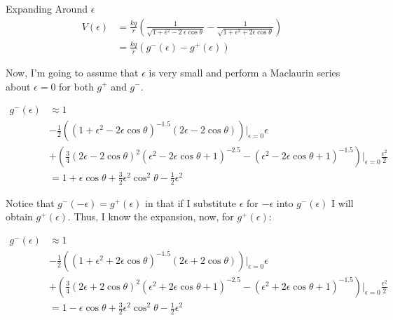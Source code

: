 \begin{homeworkProblem}[Quiz 4]
\begin{homeworkSection}{Expanding Around $\epsilon$}
    \begin{align}
        \label{}
        V(\epsilon) &= \frac{k q}{r} 
        \left(
        \frac{1}{\sqrt{1+\epsilon^2-2\ \epsilon \cos\theta}} -
        \frac{1}{\sqrt{1+ \epsilon^2+2 \epsilon \cos\theta}}
        \right) \nonumber \\
        &= \frac{k q}{r} \left( g^-(\epsilon) - g^+(\epsilon) \right)
        \nonumber
    \end{align}

    Now, I'm going to assume that $\epsilon$ is very small and perform a
    Maclaurin series about $\epsilon = 0$ for both $g^+$ and $g^-$.

    \begin{align}
       \label{}
       g^-(\epsilon) &\approx 1 \nonumber \\
       &-\frac{1}{2}\left(
       \left(1+\epsilon^2-2\epsilon\cos\theta\right)^{-1.5}(2\epsilon
       -2\cos\theta)\right)\bigg|_{\epsilon=0}\epsilon \nonumber \\
       &+\left(
       \frac{3}{4}\left(2\epsilon-2\cos\theta\right)^2(\epsilon^2-2\epsilon\cos\theta+1)^{-2.5}
       -\left(\epsilon^2-2\epsilon\cos\theta+1\right)^{-1.5}
       \right)\bigg|_{\epsilon=0}\frac{\epsilon^2}{2} \nonumber
       \\
       &= 1 + \epsilon \cos\theta + \frac{3}{2}\epsilon^2\cos^2\theta
       -\frac{1}{2}\epsilon^2
       \nonumber
    \end{align}

    Notice that $g^-(-\epsilon) = g^+(\epsilon)$ in that if I substitute
    $\epsilon$ for $-\epsilon$ into $g^-(\epsilon)$ I will obtain
    $g^+(\epsilon)$. Thus, I know the expansion, now, for
    $g^+(\epsilon)$:

    \begin{align}
       \label{}
       g^-(\epsilon) &\approx 1 \nonumber \\
       &-\frac{1}{2}\left(
       \left(1+\epsilon^2+2\epsilon\cos\theta\right)^{-1.5}(2\epsilon
       +2\cos\theta)\right)\bigg|_{\epsilon=0}\epsilon \nonumber \\
       &+\left(
       \frac{3}{4}\left(2\epsilon+2\cos\theta\right)^2(\epsilon^2+2\epsilon\cos\theta+1)^{-2.5}
       -\left(\epsilon^2+2\epsilon\cos\theta+1\right)^{-1.5}
       \right)\bigg|_{\epsilon=0}\frac{\epsilon^2}{2} \nonumber
       \\
       &= 1 - \epsilon \cos\theta + \frac{3}{2}\epsilon^2\cos^2\theta
       -\frac{1}{2}\epsilon^2
       \nonumber
    \end{align}


\end{homeworkSection}
\end{homeworkProblem}
